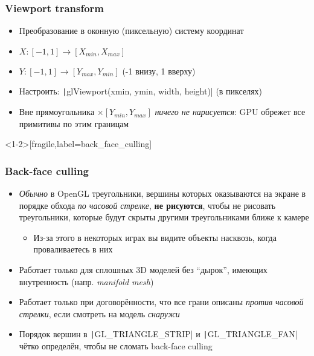 \documentclass[10pt]{beamer}
\begin{document}
\begin{frame}[fragile]
\frametitle{Viewport transform}
\begin{itemize}
\item Преобразование в оконную (пиксельную) систему координат
\item \begin{math}X: [-1, 1] \rightarrow [X_{min}, X_{max}]\end{math}
\item \begin{math}Y: [-1, 1] \rightarrow [Y_{max}, Y_{min}]\end{math} (-1 внизу, 1 вверху)
\pause
\item Настроить: \texttt|glViewport(xmin, ymin, width, height)| (в пикселях)
\pause
\item Вне прямоугольника \begin{math}[X_{min}, X_{max}]\times[Y_{min}, Y_{max}]\end{math} \textit{ничего не нарисуется}: GPU обрежет все примитивы по этим границам
\end{itemize}
\end{frame}

\begin{frame}<1-2>[fragile,label=back_face_culling]
\frametitle{Back-face culling}
\begin{itemize}
\item \textit{Обычно} в OpenGL треугольники, вершины которых оказываются на экране в порядке обхода \textit{по часовой стрелке}, \alert{\textbf{не рисуются}}, чтобы не рисовать треугольники, которые будут скрыты другими треугольниками ближе к камере
\pause
\begin{itemize}
\item Из-за этого в некоторых играх вы видите объекты насквозь, когда проваливаетесь в них
\end{itemize}
\pause
\item Работает только для сплошных 3D моделей без ``дырок'', имеющих внутренность (напр. \textit{manifold mesh})
\pause
\item Работает только при договорённости, что все грани описаны \textit{против часовой стрелки}, если смотреть на модель \textit{снаружи}
\pause
\item Порядок вершин в \texttt|GL_TRIANGLE_STRIP| и \texttt|GL_TRIANGLE_FAN| чётко определён, чтобы не сломать back-face culling
\end{itemize}
\end{frame}
\end{document}
